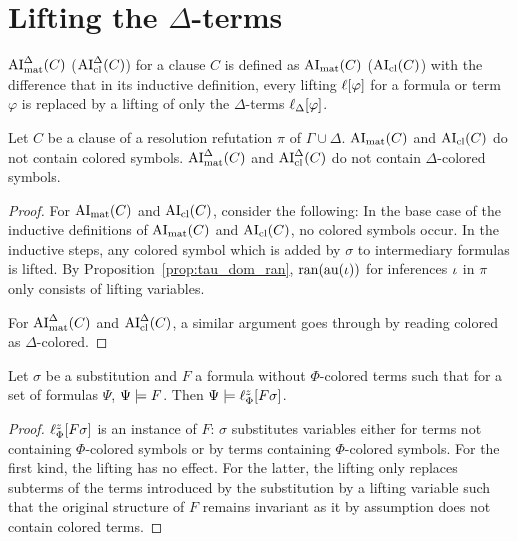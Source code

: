 \documentclass[,%
	draft=false,%
	numbers=noendperiod
	11pt,
	a4paper,
	oneside,%
	openany,
]{memoir}
\begin{document}
\section{Lifting the $\Delta$-terms}

\begin{defi}
	$\operatorname{AI}_\mathrm{mat}^\Delta(C)$ ($\operatorname{AI}_\mathrm{cl}^\Delta(C)$) for a clause $C$ is defined as $\operatorname{AI}_\mathrm{mat}(C)$ ($\operatorname{AI}_\mathrm{cl}(C)$) with the difference that in its inductive definition, every lifting $\ell[\varphi]$ for a formula or term $\varphi$ is replaced by a lifting of only the $\Delta$-terms $\ell_{\Delta}[\varphi]$.
\end{defi}

\begin{lemma}
	\label{lemma:no_colored_terms}
	Let $C$ be a clause of a resolution refutation $\pi$ of $\Gamma\cup\Delta$.
	$\operatorname{AI}_\mathrm{mat}(C)$ and $\operatorname{AI}_\mathrm{cl}(C)$ do not contain colored symbols. 
	$\operatorname{AI}_\mathrm{mat}^\Delta(C)$ and $\operatorname{AI}_\mathrm{cl}^\Delta(C)$ do not contain \mbox{$\Delta$-c}olored symbols. 
\end{lemma}
\begin{proof}
	For $\operatorname{AI}_\mathrm{mat}(C)$ and $\operatorname{AI}_\mathrm{cl}(C)$, consider the following:
	In the base case of the inductive definitions of $\operatorname{AI}_\mathrm{mat}(C)$ and $\operatorname{AI}_\mathrm{cl}(C)$, no colored symbols occur.
	In the inductive steps, any colored symbol which is added by $\sigma$ to intermediary formulas is lifted.
	By Proposition~\ref{prop:tau_dom_ran}, $\operatorname{ran}(\operatorname{au}(\iota))$ for inferences $\iota$ in $\pi$ only consists of lifting variables.

	For $\operatorname{AI}_\mathrm{mat}^\Delta(C)$ and $\operatorname{AI}_\mathrm{cl}^\Delta(C)$, a similar argument goes through by reading colored as $\Delta$-colored. 
\end{proof}

\begin{lemma}
	\label{lemma:substitute_and_lift}
	Let $\sigma$ be a substitution and $F$ a formula without $\Phi$-colored terms such that for a set of formulas $\Psi$, $\Psi \models F$.
	Then $\Psi \models \ell_{\Phi}^{z}[F\sigma]$.
\end{lemma}
\begin{proof}
	$\ell_{\Phi}^{z}[F\sigma]$ is an instance of $F$: 
	$\sigma$ substitutes variables either for terms not containing $\Phi$-colored symbols or by terms containing $\Phi$-colored symbols.
	For the first kind, the lifting has no effect.
	For the latter, the lifting only replaces subterms of the terms introduced by the substitution by a lifting variable such that the original structure of $F$ remains invariant as it by assumption does not contain colored terms.
\end{proof}
\end{document}
